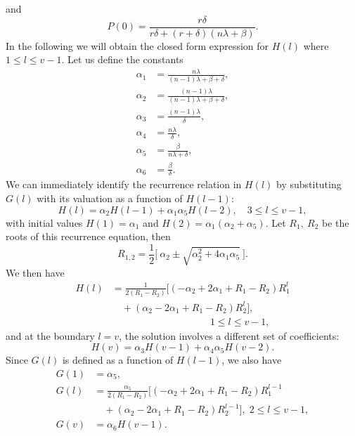 \documentclass{comjnl}
\begin{document}
and
\begin{equation}\label{eq:P0_FirstModel}
P(0) = \frac{r\delta}{r\delta+(r+\delta)(n\lambda+\beta)} .
\end{equation}
In the following we will obtain the closed form expression for
$H(l)$ where $1\leq l \leq v-1$. Let us define the constants
\begin{align}
\alpha_1 &= \frac{n\lambda}{(n-1)\lambda+\beta+\delta}, \\
\alpha_2 &= \frac{(n-1)\lambda}{(n-1)\lambda+\beta+\delta},
\nonumber \\
\alpha_3 &= \frac{(n-1)\lambda}{\delta}, \nonumber\\
\alpha_4 &= \frac{n\lambda}{\delta}, \nonumber\\
\alpha_5 &= \frac{\beta}{n\lambda+\delta}, \nonumber\\
\alpha_6 &= \frac{\beta}{\delta}. \nonumber
\end{align}
We can immediately identify the recurrence relation in $H(l)$ by
substituting $G(l)$ with its valuation as a function of $H(l-1)$:
\begin{equation}\label{rec}
H(l) = \alpha_2 H(l-1) + \alpha_1 \alpha_5 H(l-2), \quad 3\leq l
\leq v-1 ,
\end{equation}
with initial values $H(1)=\alpha_1$ and
$H(2)=\alpha_1(\alpha_2+\alpha_5)$. Let $R_1,~R_2$ be the roots of
this recurrence equation, then
\begin{equation}
R_{1,2} = \frac{1}{2} \bigg[~\alpha_2 \pm \sqrt{\alpha_2^2+
4\alpha_1\alpha_5} ~\bigg] \nonumber .
\end{equation}
We then have
\begin{equation}\label{eq:ClosedFormSolution_Hl}
\begin{split}
H(l) &= \frac{1}{2 (R_1-R_2)} \Big[
(-\alpha_2+2\alpha_1+R_1-R_2) R_1^l \\
&\quad + (\alpha_2-2\alpha_1+R_1-R_2) R_2^l \Big]  , \\
&\qquad\qquad\qquad\qquad\qquad 1 \leq l \leq v-1,
\end{split}
\end{equation}
and at the boundary $l=v$, the solution involves a different set
of coefficients:
\begin{equation}
H(v) = \alpha_3 H(v-1) + \alpha_4\alpha_5 H(v-2).
\end{equation}
Since $G(l)$ is defined as a function of $H(l-1)$, we also have
\begin{align}\label{eq:ClosedFormSolution_Gl}
G(1) &= \alpha_5 ,\\
G(l) &= \frac{\alpha_5}{2 (R_1-R_2)} \Big[ (-\alpha_2+2\alpha_1+R_1-R_2 ) R_1^{l-1} \nonumber \\
&\quad + (\alpha_2-2\alpha_1+R_1-R_2) R_2^{l-1} \Big] ,\;  2 \leq
l \leq v-1 ,
\nonumber\\
G(v) &= \alpha_6 H(v-1)  .\nonumber
\end{align}
\end{document}
